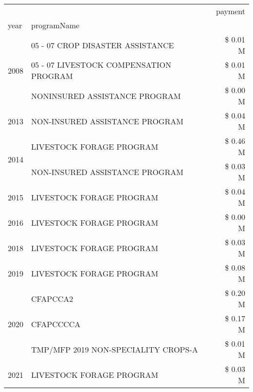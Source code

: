 \begin{tabular}{llr}
\toprule
 &  & payment \\
year & programName &  \\
\midrule
\multirow[t]{3}{*}{2008} & 05 - 07 CROP DISASTER ASSISTANCE & \$ 0.01 M \\
 & 05 - 07 LIVESTOCK COMPENSATION PROGRAM & \$ 0.01 M \\
 & NONINSURED ASSISTANCE PROGRAM & \$ 0.00 M \\
\cline{1-3}
2013 & NON-INSURED ASSISTANCE PROGRAM & \$ 0.04 M \\
\cline{1-3}
\multirow[t]{2}{*}{2014} & LIVESTOCK FORAGE PROGRAM & \$ 0.46 M \\
 & NON-INSURED ASSISTANCE PROGRAM & \$ 0.03 M \\
\cline{1-3}
2015 & LIVESTOCK FORAGE PROGRAM & \$ 0.04 M \\
\cline{1-3}
2016 & LIVESTOCK FORAGE PROGRAM & \$ 0.00 M \\
\cline{1-3}
2018 & LIVESTOCK FORAGE PROGRAM & \$ 0.03 M \\
\cline{1-3}
2019 & LIVESTOCK FORAGE PROGRAM & \$ 0.08 M \\
\cline{1-3}
\multirow[t]{3}{*}{2020} & CFAPCCA2 & \$ 0.20 M \\
 & CFAPCCCCA & \$ 0.17 M \\
 & TMP/MFP 2019 NON-SPECIALITY CROPS-A & \$ 0.01 M \\
\cline{1-3}
2021 & LIVESTOCK FORAGE PROGRAM & \$ 0.03 M \\
\cline{1-3}
\bottomrule
\end{tabular}
